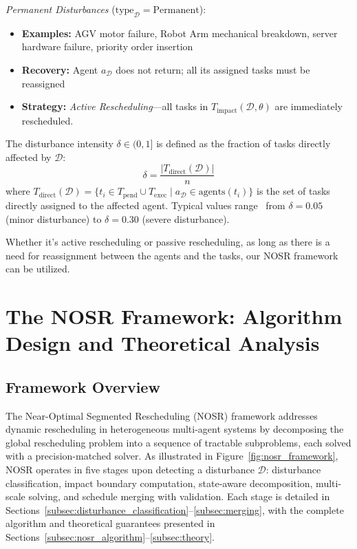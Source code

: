 \documentclass[manuscript,screen,review]{acmart}
\begin{document}
\textit{Permanent Disturbances} ($\mathrm{type}_{\mathcal{D}} = \mathrm{Permanent}$):
\begin{itemize}[leftmargin=*, nosep]
    \item \textbf{Examples:} AGV motor failure, Robot Arm mechanical breakdown,
          server hardware failure, priority order insertion
    \item \textbf{Recovery:} Agent $a_{\mathcal{D}}$ does not return;
          all its assigned tasks must be reassigned
    \item \textbf{Strategy:} \textit{Active Rescheduling}—all tasks in
          $T_{\mathrm{impact}}(\mathcal{D}, \theta)$ are immediately rescheduled.
\end{itemize}

\begin{definition}
\label{def:intensity}
The disturbance intensity $\delta \in (0, 1]$ is defined as the fraction of tasks
directly affected by $\mathcal{D}$:
\begin{equation}
    \delta = \frac{|T_{\mathrm{direct}}(\mathcal{D})|}{n}
    \label{eq:intensity}
\end{equation}
where $T_{\mathrm{direct}}(\mathcal{D}) = \{t_i \in T_{\mathrm{pend}} \cup
T_{\mathrm{exec}} \mid a_{\mathcal{D}} \in \mathrm{agents}(t_i)\}$ is the set of
tasks directly assigned to the affected agent. Typical values range~\cite{fahey2016evaluating} from
$\delta = 0.05$ (minor disturbance) to $\delta = 0.30$ (severe disturbance).
\end{definition}

Whether it's active rescheduling or passive rescheduling, as long as there is a need for reassignment between the agents and the tasks, our NOSR framework can be utilized.

\section{The NOSR Framework: Algorithm Design and Theoretical Analysis}
\label{sec:nosr}

\subsection{Framework Overview}
\label{subsec:overview}

The Near-Optimal Segmented Rescheduling (NOSR) framework addresses dynamic
rescheduling in heterogeneous multi-agent systems by decomposing the global
rescheduling problem into a sequence of tractable subproblems, each solved
with a precision-matched solver. As illustrated in Figure~\ref{fig:nosr_framework},
NOSR operates in five stages upon detecting a disturbance $\mathcal{D}$:
disturbance classification, impact boundary computation, state-aware
decomposition, multi-scale solving, and schedule merging with validation.
Each stage is detailed in Sections~\ref{subsec:disturbance_classification}--\ref{subsec:merging},
with the complete algorithm and theoretical guarantees presented in
Sections~\ref{subsec:nosr_algorithm}--\ref{subsec:theory}.
\end{document}
